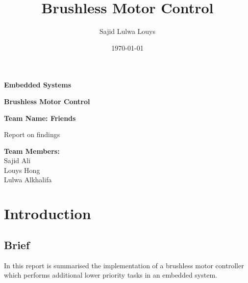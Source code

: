 \documentclass{article}
\title{Brushless Motor Control}
\author{Sajid Lulwa Louys}
\date{\today}
\begin{document}
\begin{titlepage}
    \begin{center}
        \vspace*{1cm}
            
        \Huge
        \textbf{Embedded Systems}
            
        \vspace{0.5cm}
        \LARGE
        \textbf{Brushless Motor Control}
            
        \vspace{1.5cm}
            
        \textbf{Team Name: Friends}\\ 
            
        \vfill
            
        Report on findings\\
       
            
        \vspace{0.8cm}
         
            
        \Large
        \textbf{Team Members:}\\
        Sajid Ali\\
        Louys Hong \\
        Lulwa Alkhalifa \\
            
    \end{center}
\end{titlepage}


\tableofcontents
\clearpage

\setcounter{page}{1}

\section{Introduction}
\subsection{Brief}
\noindent In this report is summarised the implementation of a brushless motor controller which performs additional lower priority tasks in an embedded system.
\end{document}
